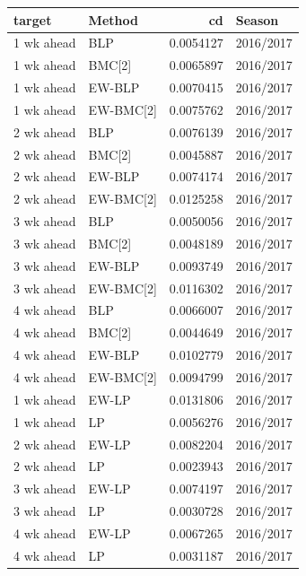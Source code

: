 \documentclass[
]{article}
\begin{document}
\begin{tabular}{l|l|r|l}
\hline
target & Method & cd & Season\\
\hline
1 wk ahead & BLP & 0.0054127 & 2016/2017\\
\hline
1 wk ahead & BMC[2] & 0.0065897 & 2016/2017\\
\hline
1 wk ahead & EW-BLP & 0.0070415 & 2016/2017\\
\hline
1 wk ahead & EW-BMC[2] & 0.0075762 & 2016/2017\\
\hline
2 wk ahead & BLP & 0.0076139 & 2016/2017\\
\hline
2 wk ahead & BMC[2] & 0.0045887 & 2016/2017\\
\hline
2 wk ahead & EW-BLP & 0.0074174 & 2016/2017\\
\hline
2 wk ahead & EW-BMC[2] & 0.0125258 & 2016/2017\\
\hline
3 wk ahead & BLP & 0.0050056 & 2016/2017\\
\hline
3 wk ahead & BMC[2] & 0.0048189 & 2016/2017\\
\hline
3 wk ahead & EW-BLP & 0.0093749 & 2016/2017\\
\hline
3 wk ahead & EW-BMC[2] & 0.0116302 & 2016/2017\\
\hline
4 wk ahead & BLP & 0.0066007 & 2016/2017\\
\hline
4 wk ahead & BMC[2] & 0.0044649 & 2016/2017\\
\hline
4 wk ahead & EW-BLP & 0.0102779 & 2016/2017\\
\hline
4 wk ahead & EW-BMC[2] & 0.0094799 & 2016/2017\\
\hline
1 wk ahead & EW-LP & 0.0131806 & 2016/2017\\
\hline
1 wk ahead & LP & 0.0056276 & 2016/2017\\
\hline
2 wk ahead & EW-LP & 0.0082204 & 2016/2017\\
\hline
2 wk ahead & LP & 0.0023943 & 2016/2017\\
\hline
3 wk ahead & EW-LP & 0.0074197 & 2016/2017\\
\hline
3 wk ahead & LP & 0.0030728 & 2016/2017\\
\hline
4 wk ahead & EW-LP & 0.0067265 & 2016/2017\\
\hline
4 wk ahead & LP & 0.0031187 & 2016/2017\\
\hline
\end{tabular}
\end{document}
